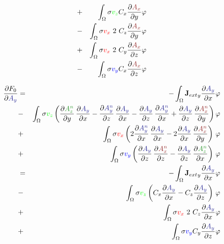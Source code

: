 \documentclass[smallextended]{svjour3}       %
\begin{document}
\begin{eqnarray}
			\nonumber \\
			& + &\int_{\Omega} \sigma  \textcolor{gre}{v_z}    C_x \frac{\partial \textcolor{darkred}{A_x}}{\partial y} \varphi \nonumber \\			
			& - & \int_{\Omega} \sigma \textcolor{red}{v_x}\ 2\ C_z \frac{\partial \textcolor{darkred}{A_x}}{\partial y} \varphi \nonumber \\			
			& + & \int_{\Omega} \sigma \textcolor{red}{v_x}\ 2\ C_y \frac{\partial \textcolor{darkred}{A_x}}{\partial z} \varphi \nonumber \\			
			& - & \int_{\Omega} \sigma \textcolor{blu}{v_y}    C_x \frac{\partial \textcolor{darkred}{A_x}}{\partial z} \varphi
						\end{eqnarray}
						
			\begin{eqnarray}
			\frac{\partial F_0}{\partial \textcolor{darkblu}{A_y}} & = &
			-\int_{\Omega} {\mathbf{J}_{ext}}_y \frac{\partial \textcolor{darkblu}{A_y}}{\partial x} \varphi
			\nonumber \\
			& - & \int_{\Omega} \sigma \textcolor{gre}{v_z} \left(\frac{\partial \textcolor{darkgre}{A_z^n}}{\partial y}\,\frac{\partial \textcolor{darkblu}{A_y}}{\partial x} - \frac{\partial \textcolor{darkblu}{A_y^n}}{\partial z}\,\frac{\partial \textcolor{darkblu}{A_y}}{\partial x} - \frac{\partial \textcolor{darkblu}{A_y}}{\partial z}\,\frac{\partial \textcolor{darkblu}{A_y^n}}{\partial x} + \frac{\partial \textcolor{darkblu}{A_y}}{\partial z}\,\frac{\partial \textcolor{darkred}{A_x^n}}{\partial y} \right) \varphi \nonumber \\			
			& + &\int_{\Omega} \sigma \textcolor{red}{v_x} \left(2 \frac{\partial \textcolor{darkblu}{A_y^n}}{\partial x}\,\frac{\partial \textcolor{darkblu}{A_y}}{\partial x} - 2 \frac{\partial \textcolor{darkblu}{A_y}}{\partial x}\,\frac{\partial \textcolor{darkred}{A_x^n}}{\partial y}\right)\, \varphi \nonumber \\		
			& + & \int_{\Omega} \sigma \textcolor{blu}{v_y} \left(\frac{\partial \textcolor{darkblu}{A_y}}{\partial z}\,\frac{\partial \textcolor{darkred}{A_x^n}}{\partial z} - \frac{\partial \textcolor{darkblu}{A_y}}{\partial z}\,\frac{\partial \textcolor{darkgre}{A_z^n}}{\partial x} \right)\, \varphi\\
			 & = &
			-\int_{\Omega} {\mathbf{J}_{ext}}_y \frac{\partial \textcolor{darkblu}{A_y}}{\partial x} \varphi
			\nonumber \\
			& - &\int_{\Omega} \sigma  \textcolor{gre}{v_z} \left( C_x \frac{\partial \textcolor{darkblu}{A_y}}{\partial x} - C_z \frac{\partial \textcolor{darkblu}{A_y}}{\partial z}\right)\, \varphi \nonumber \\			
			& + & \int_{\Omega} \sigma \textcolor{red}{v_x}\ 2\ C_z \frac{\partial \textcolor{darkblu}{A_y}}{\partial x} \varphi \nonumber \\
			& + & \int_{\Omega} \sigma \textcolor{blu}{v_y}    C_y \frac{\partial \textcolor{darkblu}{A_y}}{\partial z} \varphi
					\end{eqnarray}
					
\end{document}
